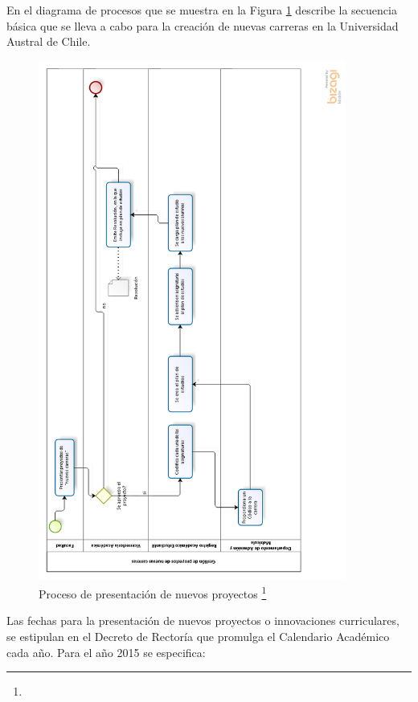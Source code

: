 \documentclass[12pt]{article}
\begin{document}
			En el diagrama de procesos que se muestra en la Figura \ref{Figura2} describe la secuencia básica que se lleva a cabo para la creación de nuevas carreras en la Universidad Austral de Chile.
			\begin{figure}[H]
				\centering
				\includegraphics[width=0.9\textwidth]{Procesos_Registro_academico.png}
				\caption[Proceso de presentación de nuevos proyectos]{Proceso de presentación de nuevos proyectos \footnote{}}
				\label{Figura2}
			\end{figure}
			
			Las fechas para la presentación de nuevos proyectos o innovaciones curriculares, se estipulan en el Decreto de Rectoría  que promulga el Calendario Académico cada año. Para el año 2015 se especifica:
			
\end{document}
